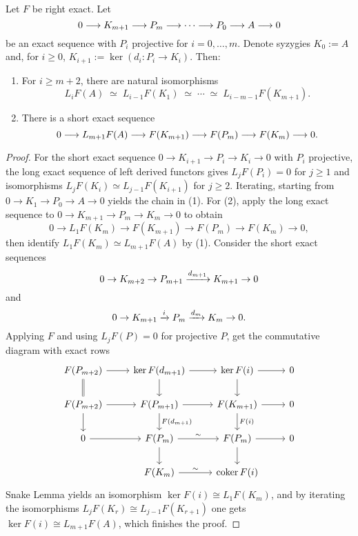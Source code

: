 
\begin{proposition*}
	Let \( F \) be right exact. Let
	\[
		0 \longrightarrow K_{m+1} \longrightarrow P_m \longrightarrow \dotsm \longrightarrow P_0 \longrightarrow A \longrightarrow 0
	\]
	be an exact sequence with \( P_i \) projective for \( i=0,\dots,m \). Denote syzygies \( K_0:=A \) and, for \( i\ge 0 \), \( K_{i+1}:=\ker(d_i: P_i\to K_i) \). Then:
	\begin{enumerate}
		\item For \( i\ge m+2 \), there are natural isomorphisms
			\[
				L_i F(A)\;\simeq\; L_{i-1}F(K_1)\;\simeq\; \dotsm\; \simeq\; L_{i-m-1}F(K_{m+1}).
			\]
		\item There is a short exact sequence
			\[
				0 \longrightarrow L_{m+1}F(A) \longrightarrow F(K_{m+1}) \longrightarrow F(P_m) \longrightarrow F(K_m) \longrightarrow 0.
			\]
	\end{enumerate}
\end{proposition*}

\begin{proof}
	For the short exact sequence \( 0\to K_{i+1}\to P_i\to K_i\to 0 \) with \( P_i \) projective, the long exact sequence of left derived functors gives \( L_jF(P_i)=0 \) for \( j\ge 1 \) and isomorphisms \( L_jF(K_i)\simeq L_{j-1}F(K_{i+1}) \) for \( j\ge 2 \). Iterating, starting from \( 0\to K_1\to P_0\to A\to 0 \) yields the chain in (1). For (2), apply the long exact sequence to \( 0\to K_{m+1}\to P_m\to K_m\to 0 \) to obtain
	\[
		0 \to L_1F(K_m) \to F(K_{m+1}) \to F(P_m) \to F(K_m) \to 0,
	\]
	then identify \( L_1F(K_m) \simeq L_{m+1}F(A) \) by (1). Consider the short exact sequences
	\[
		0 \to K_{m+2} \to P_{m+1} \xrightarrow{d_{m+1}} K_{m+1} \to 0
	\]
	and
	\[
		0 \to K_{m+1}\xrightarrow{i} P_m\xrightarrow{d_m} K_m \to 0.
	\]
	Applying \( F \) and using \( L_jF(P)=0 \) for projective \( P \), get the commutative diagram with exact rows
	\[
		\begin{tikzcd}
			F(P_{m+2}) \arrow[r] \arrow[d, equals] & \ker F(d_{m+1}) \arrow[r] \arrow[d] & \ker F(i) \arrow[r] \arrow[d] & 0 \\
			F(P_{m+2}) \arrow[r] \arrow[d] & F(P_{m + 1}) \arrow[d,"F(d_{m + 1})"] \arrow[r] & F(K_{m + 1}) \arrow[r] \arrow[d, "F(i)"] & 0 \\
			0 \arrow[r] & F(P_m) \arrow[r,"\sim"] \arrow[d] & F(P_m) \arrow[r] \arrow[d] & 0 \\
			& F(K_m) \arrow[r,"\sim"] & \coker F(i)
		\end{tikzcd}
	\]
	Snake Lemma yields an isomorphism \( \ker F(i)\cong L_1F(K_m) \), and by iterating the isomorphisms \( L_jF(K_r)\cong L_{j-1}F(K_{r+1}) \) one gets \( \ker F(i)\cong L_{m+1}F(A) \), which finishes the proof.\qedhere
\end{proof}

